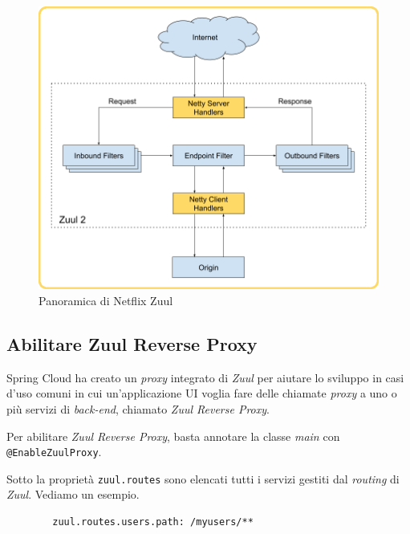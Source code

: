 \begin{figure}[H]
	\centering
	\includegraphics[width=\textwidth]{immagini/zuul.png}
	\caption[Panoramica di Netflix Zuul]{Panoramica di Netflix Zuul\footnotemark}
	\label{netflix-zuul}
\end{figure}

\subsection{Abilitare Zuul Reverse Proxy} Spring Cloud ha creato un \textit{proxy} integrato di \textit{Zuul} per aiutare lo sviluppo in casi d'uso comuni in cui un'applicazione UI voglia fare delle chiamate \textit{proxy} a uno o più servizi di \textit{back-end}, chiamato \textit{Zuul Reverse Proxy}.

Per abilitare \textit{Zuul Reverse Proxy}, basta annotare la classe \textit{main} con \texttt{@EnableZuulProxy}.

Sotto la proprietà \texttt{zuul.routes} sono elencati tutti i servizi gestiti dal \textit{routing} di \textit{Zuul}.
Vediamo un esempio.

\begin{tcolorbox}
	\begin{verbatim}
		zuul.routes.users.path: /myusers/**
	\end{verbatim}
\end{tcolorbox}

